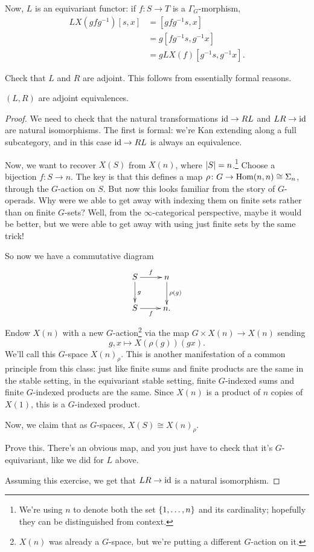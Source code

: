 Now, $L$ is an equivariant functor: if $f\colon S\to T$ is a $\Gamma_G$-morphism,
\begin{align*}
	LX(gfg^{-1})[s,x] &= [gfg^{-1}s, x]\\
	&= g[fg^{-1}s, g^{-1}x]\\
	&= gLX(f)[g^{-1}s, g^{-1}x].
\end{align*}
\begin{ex}
Check that $L$ and $R$ are adjoint. This follows from essentially formal reasons.
\end{ex}
\begin{prop}
\label{LReq}
$(L,R)$ are adjoint equivalences.
\end{prop}
\begin{proof}
We need to check that the natural transformations $\mathrm{id}\to RL$ and $LR\to\mathrm{id}$ are natural isomorphisms. The first is
formal: we're Kan extending along a full subcategory, and in this case $\mathrm{id}\to RL$ is always an equivalence.

Now, we want to recover $X(S)$ from $X(n)$, where $\lvert S\rvert = n$.\footnote{We're using $n$ to denote both the set
$\{1,\dotsc,n\}$ and its cardinality; hopefully they can be distinguished from context.} Choose a bijection
$f\colon S\to n$. The key is that this defines a map $\rho\colon G\to\operatorname{Hom}(n, n)\cong\Sigma_n$, through the
$G$-action on $S$. But now this looks familiar from the story of $G$-operads. Why were
we able to get away with indexing them on finite sets rather than on finite $G$-sets? Well, from the
$\infty$-categorical perspective, maybe it would be better, but we were able to get away with using just finite
sets by the same trick!

So now we have a commutative diagram
\[\xymatrix{
	S\ar[r]^f\ar[d]^g & n\ar[d]^{\rho(g)}\\
	S\ar[r]_f &n. 
}\]
Endow $X(n)$ with a new $G$-action\footnote{$X(n)$ was already a $G$-space, but we're putting a different
$G$-action on it.} via the map $G\times X(n)\to X(n)$ sending
\[g,x\mapsto X(\rho(g))(gx).\]
We'll call this $G$-space $X(n)_\rho$. This is another manifestation of a common principle from this class: just
like finite sums and finite products are the same in the stable setting, in the equivariant stable setting, finite
$G$-indexed sums and finite $G$-indexed products are the same. Since $X(n)$ is a product of $n$ copies of $X(1)$,
this is a $G$-indexed product.

Now, we claim that as $G$-spaces, $X(S)\cong X(n)_\rho$.
\begin{ex}
Prove this. There's an obvious map, and you just have to check that it's $G$-equivariant, like we did for $L$
above.
\end{ex}
Assuming this exercise, we get that $LR\to\mathrm{id}$ is a natural isomorphism.
\end{proof}
